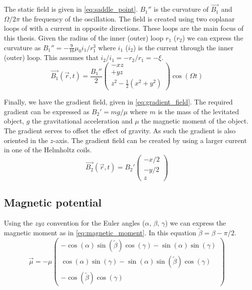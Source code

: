 The static field is given in \autoref{eq:saddle_point}. $B_1''$ is the curvature of $\vec{B_1}$ and $\Omega / 2\pi$ the frequency of the oscillation. The field is created using two coplanar loops of with a current in opposite directions. These loops are the main focus of this thesis. Given the radius of the inner (outer) loop $r_1$ ($r_2$) we can express the curvature as $B_1'' = -\frac{9}{16}\mu_0i_1/r_1^3$ where $i_1$ ($i_2$) is the current through the inner (outer) loop\cite{perdriat}. This assumes that $i_2/i_1 = -r_2/r_1 = -\xi$.
\begin{equation}
    \vec{B_1}(\vec{r}, t) = \frac{B_1''}{2} \begin{pmatrix}
        -xz \\
        +yz \\
        z^2 - \frac{1}{2}\left(x^2 + y^2\right)
    \end{pmatrix} \cos(\Omega t)
    \label{eq:saddle_point}
\end{equation}

Finally, we have the gradient field, given in \autoref{eq:gradient_field}. The required gradient can be expressed as $B_2' = mg/\mu$ where $m$ is the mass of the levitated object, $g$ the gravitational acceleration and $\mu$ the magnetic moment of the object. The gradient serves to offset the effect of gravity. As such the gradient is also oriented in the $z$-axis. The gradient field can be created by using a larger current in one of the Helmholtz coils.
\begin{equation}
    \vec{B_2}(\vec{r}, t) = B_2' \begin{pmatrix}
        -x / 2 \\
        -y / 2 \\
        z
    \end{pmatrix}
    \label{eq:gradient_field}
\end{equation}

\subsection{Magnetic potential}
\label{subsec:magnetic_moment}
Using the $zyz$ convention for the Euler angles ($\alpha$, $\beta$, $\gamma$) we can express the magnetic moment as in \autoref{eq:magnetic_moment}\cite{perdriat}. In this equation $\tilde\beta = \beta - \pi/2$.
\begin{equation}
    \vec{\mu} = -\mu \begin{pmatrix}
        -\cos(\alpha)\sin(\tilde\beta)\cos(\gamma) - \sin(\alpha)\sin(\gamma) \\
        \cos(\alpha)\sin(\gamma) - \sin(\alpha)\sin(\tilde\beta)\cos(\gamma) \\
        -\cos(\tilde\beta)\cos(\gamma)
    \end{pmatrix}
    \label{eq:magnetic_moment}
\end{equation}

